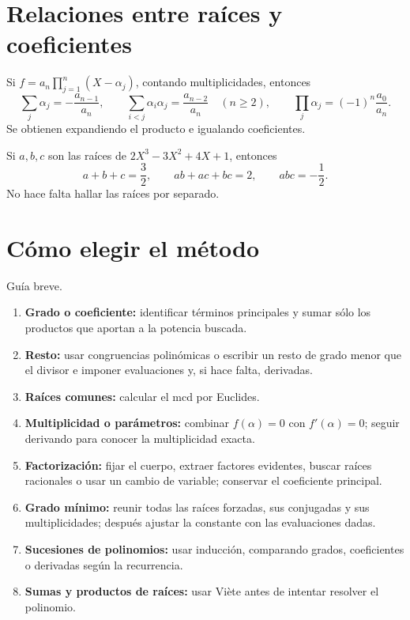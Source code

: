 \section{Relaciones entre raíces y coeficientes}
\begin{proposicion}[{title={Fórmulas de Viète}}]
Si $f=a_n\prod_{j=1}^n(X-\alpha_j)$, contando multiplicidades, entonces
\[
\sum_j\alpha_j=-\frac{a_{n-1}}{a_n},\qquad
\sum_{i<j}\alpha_i\alpha_j=\frac{a_{n-2}}{a_n}\quad(n\geq2),\qquad
\prod_j\alpha_j=(-1)^n\frac{a_0}{a_n}.
\]
Se obtienen expandiendo el producto e igualando coeficientes.
\end{proposicion}
\begin{ejemplo}
Si $a,b,c$ son las raíces de $2X^3-3X^2+4X+1$, entonces
\[
a+b+c=\frac32,\qquad ab+ac+bc=2,\qquad abc=-\frac12.
\]
No hace falta hallar las raíces por separado.
\end{ejemplo}
\section{Cómo elegir el método}
\begin{nota}{Guía breve.}
\begin{enumerate}
\item \textbf{Grado o coeficiente:} identificar términos principales y
sumar sólo los productos que aportan a la potencia buscada.
\item \textbf{Resto:} usar congruencias polinómicas o escribir un resto
de grado menor que el divisor e imponer evaluaciones y, si hace falta, derivadas.
\item \textbf{Raíces comunes:} calcular el mcd por Euclides.
\item \textbf{Multiplicidad o parámetros:} combinar $f(\alpha)=0$ con
$f'(\alpha)=0$; seguir derivando para conocer la multiplicidad exacta.
\item \textbf{Factorización:} fijar el cuerpo, extraer factores evidentes,
buscar raíces racionales o usar un cambio de variable; conservar el coeficiente principal.
\item \textbf{Grado mínimo:} reunir todas las raíces forzadas, sus conjugadas
y sus multiplicidades; después ajustar la constante con las evaluaciones dadas.
\item \textbf{Sucesiones de polinomios:} usar inducción, comparando grados,
coeficientes o derivadas según la recurrencia.
\item \textbf{Sumas y productos de raíces:} usar Viète antes de intentar resolver el polinomio.
\end{enumerate}
\end{nota}